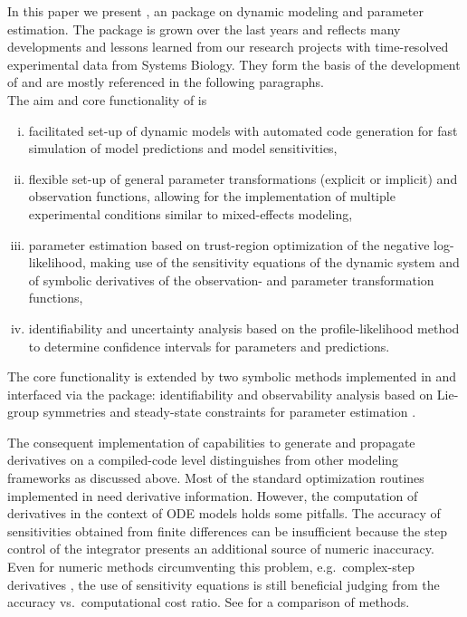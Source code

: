 \documentclass[article]{jss}
\begin{document}
In this paper we present , an  package on dynamic modeling and parameter estimation. 
The package is grown over the last years and reflects many developments and lessons learned from our research projects with time-resolved experimental data from Systems Biology. They form the basis of the development of  and are mostly referenced in the following paragraphs.\\
The aim and core functionality of  is
\begin{enumerate}[(i)]
	\item facilitated set-up of dynamic models with automated  code generation for fast simulation of model predictions and model sensitivities,
	\item flexible set-up of general parameter transformations (explicit or implicit) and observation functions, allowing for the implementation of multiple experimental conditions similar to mixed-effects modeling,
	\item parameter estimation based on trust-region optimization of the negative log-likelihood, making use of the sensitivity equations of the dynamic system and of symbolic derivatives of the observation- and parameter transformation functions,
	\item identifiability and uncertainty analysis based on the profile-likelihood method to determine confidence intervals for parameters and predictions.
\end{enumerate}

The core functionality is extended by two symbolic methods implemented in  and interfaced via the  package: identifiability and observability analysis based on Lie-group symmetries \citep{merkt2015higher} and steady-state constraints for parameter estimation \citep{rosenblatt2016customized}.

The consequent implementation of capabilities to generate and propagate derivatives on a compiled-code level distinguishes  from other modeling frameworks as discussed above. Most of the standard optimization routines implemented in  need derivative information. However, the computation of derivatives in the context of ODE models holds some pitfalls. The accuracy of sensitivities obtained from finite differences can be insufficient because the step control of the integrator presents an additional source of numeric inaccuracy. Even for numeric methods circumventing this problem, e.g.~complex-step derivatives \citep{squire1998using}, the use of sensitivity equations is still beneficial judging from the accuracy vs.~computational cost ratio. See \cite{raue2013lessons} for a comparison of methods.
\end{document}
